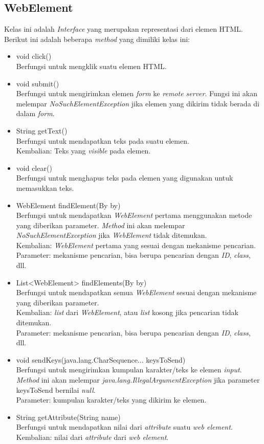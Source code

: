 \subsection{WebElement}
\label{subsec:webelement}  
Kelas ini adalah \textit{Interface} yang  merupakan representasi dari elemen HTML. Berikut ini adalah beberapa \textit{method} yang dimiliki kelas ini:
\begin{itemize}
\item void click()\\
Berfungsi untuk mengklik suatu elemen HTML.
\item void submit()\\
Berfungsi untuk mengirimkan elemen \textit{form} ke \textit{remote server}. Fungsi ini akan melempar \textit{NoSuchElementException} jika elemen yang dikirim tidak berada di dalam \textit{form}. 
\item String getText()\\
Berfungsi untuk mendapatkan teks pada suatu elemen.\\
Kembalian: Teks yang \textit{visible} pada elemen.

\item void clear()\\
Berfungsi untuk menghapus teks pada elemen yang digunakan untuk memasukkan teks.
\item WebElement findElement(By by)\\
Berfungsi untuk mendapatkan \textit{WebElement} pertama menggunakan metode yang diberikan parameter. \textit{Method} ini akan melempar \textit{NoSuchElementException} jika \textit{WebElement} tidak ditemukan.\\
Kembalian: \textit{WebElement} pertama yang sesuai dengan mekanisme pencarian.\\
Parameter: mekanisme pencarian, bisa berupa pencarian dengan \textit{ID}, \textit{class}, dll.

\item List<WebElement> findElements(By by)\\
Berfungsi untuk mendapatkan semua \textit{WebElement} sesuai dengan mekanisme yang diberikan parameter.\\
Kembalian: \textit{list} dari \textit{WebElement}, atau \textit{list} kosong jika pencarian tidak ditemukan.\\
Parameter: mekanisme pencarian, bisa berupa pencarian dengan \textit{ID}, \textit{class}, dll.
\item void sendKeys(java.lang.CharSequence... keysToSend)\\
Berfungsi untuk mengirimkan kumpulan karakter/teks ke elemen \textit{input}. \textit{Method} ini akan melempar \textit{java.lang.IllegalArgumentException} jika parameter keysToSend bernilai \textit{null}.\\
Parameter: kumpulan karakter/teks yang dikirim ke elemen.

\item String getAttribute(String name)\\
Berfungsi untuk mendapatkan nilai dari \textit{attribute} suatu \textit{web element}.\\
Kembalian: nilai dari \textit{attribute} dari \textit{web element}.
\end{itemize} 

